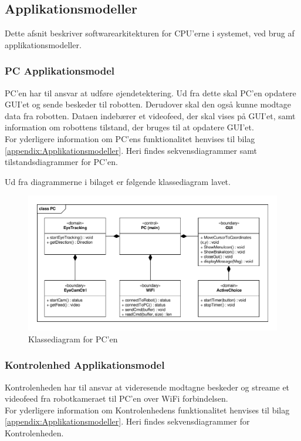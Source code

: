 \subsection{Applikationsmodeller}
Dette afsnit beskriver softwarearkitekturen for CPU'erne i systemet, ved brug af applikationsmodeller. 

\subsubsection{PC Applikationsmodel}
PC'en har til ansvar at udføre øjendetektering. 
Ud fra dette skal PC'en opdatere GUI'et og sende beskeder til robotten. 
Derudover skal den også kunne modtage data fra robotten. 
Dataen indebærer et videofeed, der skal vises på GUI'et, samt information om robottens tilstand, der bruges til at opdatere GUI'et. \\ 
For yderligere information om PC'ens funktionalitet henvises til bilag \ref{appendix:Applikationsmodeller}. 
Heri findes sekvensdiagrammer samt tilstandsdiagrammer for PC'en. 

Ud fra diagrammerne i bilaget er følgende klassediagram lavet.

\begin{figure}[H]
	\centering
	\includegraphics[width = \textwidth]{figur/classPCVisioFil.pdf}
	\caption{Klassediagram for PC'en}
	\label{fig:klassediagramPC}
\end{figure}

\newpage
\subsubsection{Kontrolenhed Applikationsmodel}
Kontrolenheden har til ansvar at videresende modtagne beskeder og streame et videofeed fra robotkameraet til PC'en over WiFi forbindelsen. \\ 
For yderligere information om Kontrolenhedens funktionalitet henvises til bilag \ref{appendix:Applikationsmodeller}. 
Heri findes sekvensdiagrammer for Kontrolenheden.

